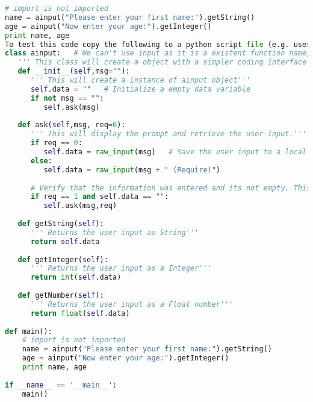 \begin{lstlisting}[caption=Retrive and Validate Input,language={Python},
xleftmargin=15pt, label=lst:retriveandvalidateinput]
# import is not imported
name = ainput("Please enter your first name:").getString()
age = ainput("Now enter your age:").getInteger()
print name, age
To test this code copy the following to a python script file (e.g. userInteraction.py)
class ainput:   # We can't use input as it is a existent function name, so we use AInput for Advance Input
   ''' This class will create a object with a simpler coding interface to retrieve console input'''
   def __init__(self,msg=""):
      ''' This will create a instance of ainput object'''
      self.data = ""   # Initialize a empty data variable
      if not msg == "":
         self.ask(msg)
 
   def ask(self,msg, req=0):
      ''' This will display the prompt and retrieve the user input.'''
      if req == 0:
         self.data = raw_input(msg)   # Save the user input to a local object variable
      else:
         self.data = raw_input(msg + " (Require)")
 
      # Verify that the information was entered and its not empty. This will accept a space character. Better Validation needed
      if req == 1 and self.data == "":
         self.ask(msg,req)
 
   def getString(self):
      ''' Returns the user input as String'''
      return self.data
 
   def getInteger(self):
      ''' Returns the user input as a Integer'''
      return int(self.data)
 
   def getNumber(self):
      ''' Returns the user input as a Float number'''
      return float(self.data)
 
def main():
	# import is not imported
	name = ainput("Please enter your first name:").getString()
	age = ainput("Now enter your age:").getInteger()
	print name, age
 
if __name__ == '__main__':
	main()
\end{lstlisting}

